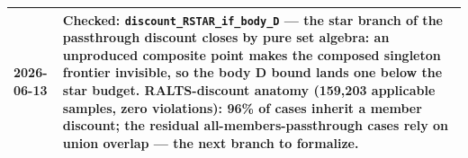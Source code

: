 \documentclass[11pt]{article}
\newcommand{\code}[1]{\texttt{\small #1}}
\begin{document}
\begin{longtable}{@{}p{}p{}@{}}
2026-06-13 & Checked: \code{discount\_RSTAR\_if\_body\_D} --- the star branch of the passthrough discount closes by pure set algebra: an unproduced composite point makes the composed singleton frontier invisible, so the body D bound lands one below the star budget.  RALTS-discount anatomy (159{,}203 applicable samples, zero violations): 96\% of cases inherit a member discount; the residual all-members-passthrough cases rely on union overlap --- the next branch to formalize. \\
\bottomrule
\end{longtable}
\end{document}
